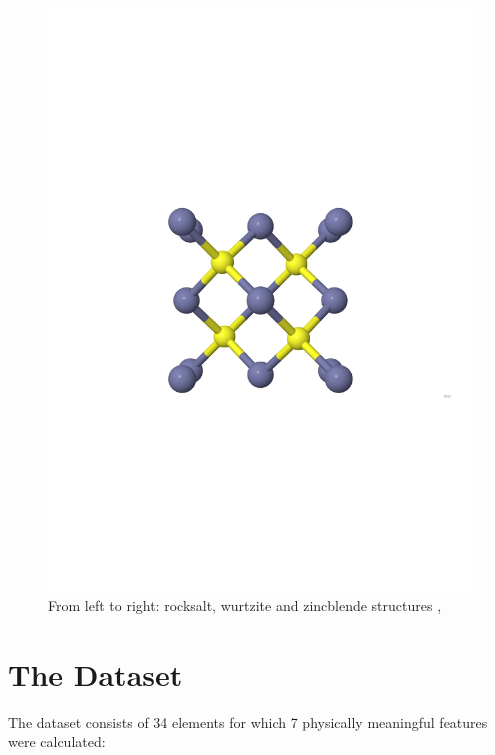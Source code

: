 \documentclass[11pt,oneside,czech,american]{book} %
\theoremstyle{definition} %
\theoremstyle{definition}
\begin{document}
\begin{figure}[H]
	\includegraphics[scale=0.26]{zincblende_nolabels.pdf}
	\caption{From left to right: rocksalt, wurtzite and zincblende structures \parencite{jmol}, \parencite{RS_ZB_WZ}}
	\label{jmol_struct}
\end{figure}


\section{The Dataset}
The dataset consists of 34 elements for which 7 physically meaningful features were calculated:
\end{document}
